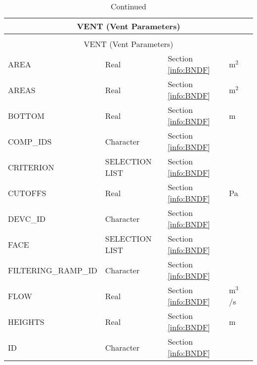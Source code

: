 \begin{longtable}{@{\extracolsep{\fill}}|l|l|l|l|l|}
\caption[Boundary file parameters ({\ct VENT} namelist group)]{For more information see Section~\ref{info:BNDF}.}
\label{tbl:VENT} \\
\hline
\multicolumn{5}{|c|}{{\ct VENT} (Vent Parameters)} \\
\hline \hline
\endfirsthead
\caption[]{Continued} \\
\hline
\multicolumn{5}{|c|}{{\ct VENT} (Vent Parameters)} \\
\hline \hline
\endhead
{\ct AREA}      	  & Real  	& Section \ref{info:BNDF}                 & m$^2$                       &                 \\ \hline
{\ct AREAS}      	  & Real  	& Section \ref{info:BNDF}                 & m$^2$                       &                 \\ \hline
{\ct BOTTOM}       	  & Real  	& Section \ref{info:BNDF}                 & m                           &                 \\ \hline
{\ct COMP\_IDS}    	  & Character   & Section \ref{info:BNDF}                 &                             &                 \\ \hline
{\ct CRITERION}           & {\ct SELECTION LIST}   & Section \ref{info:BNDF}                 &                             &                 \\ \hline
{\ct CUTOFFS}         & Real  	& Section \ref{info:BNDF}                 & Pa                          &                 \\ \hline
{\ct DEVC\_ID}            & Character   & Section \ref{info:BNDF}                 &                             &                 \\ \hline
{\ct FACE}       	  & {\ct SELECTION LIST}   & Section \ref{info:BNDF}                 &                             &                 \\ \hline
{\ct FILTERING\_RAMP\_ID}     	  & Character   & Section \ref{info:BNDF}                 &                             &                 \\ \hline
{\ct FLOW}      	  & Real  	& Section \ref{info:BNDF}                 & m$^3$/s                     &                 \\ \hline
{\ct HEIGHTS}         & Real  	& Section \ref{info:BNDF}                 & m                           &                 \\ \hline
{\ct ID}       		  & Character   & Section \ref{info:BNDF}                 &                             &                 \\ \hline

\end{longtable}
